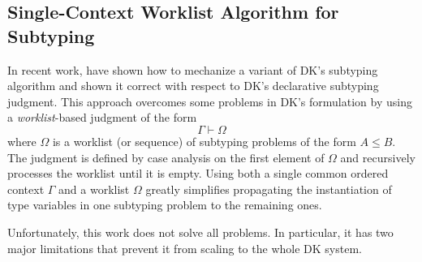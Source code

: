 % 
% 
% 
\subsection{Single-Context Worklist Algorithm for Subtyping}

In recent work, \citet{itp2018} have shown how to mechanize a variant of DK's
subtyping algorithm and shown it correct with respect to DK's declarative
subtyping judgment. This approach overcomes some problems in DK's formulation
by using a \emph{worklist}-based judgment of the form $$\Gamma \vdash \Omega$$
where $\Omega$ is a worklist (or sequence) of subtyping problems of the
form $A \leq B$.  The judgment is defined by case analysis on the first
element of $\Omega$ and recursively processes the worklist until it is empty.
Using both a single common ordered context $\Gamma$ and a worklist $\Omega$ greatly
simplifies propagating the instantiation of type variables in one
subtyping problem to the remaining ones.

Unfortunately, this work does not solve all problems. In particular, it has two
major limitations that prevent it from scaling to the whole DK system. 

